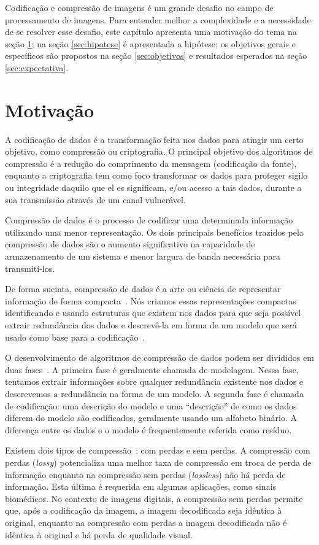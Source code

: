 Codificação e compressão de imagens é um grande desafio no campo de processamento de imagens. Para entender melhor a complexidade e a necessidade de se resolver esse desafio, este capítulo apresenta uma motivação do tema na seção \ref{sec:motivacao}; na seção \ref{sec:hipotese} é apresentada a hipótese; os objetivos gerais e específicos são propostos na seção \ref{sec:objetivos} e  resultados esperados na seção \ref{sec:expectativa}.

\section{Motivação}
\label{sec:motivacao}
A codificação de dados é a transformação feita nos dados para atingir um certo objetivo, como compressão ou criptografia. O principal objetivo dos algoritmos de compressão é a redução do comprimento da mensagem (codificação da fonte), enquanto a criptografia tem como foco transformar os dados para proteger sigilo ou integridade daquilo que el es significam, e/ou acesso a tais dados, durante a sua transmissão através de um canal vulnerável.

Compressão de dados é o processo de codificar uma determinada informação utilizando uma menor representação. Os dois principais benefícios trazidos pela compressão de dados são o aumento significativo na capacidade de armazenamento de um sistema e menor largura de banda necessária para transmití-los.  

De forma sucinta, compressão de dados é a arte ou ciência de representar informação de forma compacta~\cite{sayood2017introduction}. Nós criamos essas representações compactas identificando e usando estruturas que existem nos dados para que seja possível extrair redundância dos dados e descrevê-la em forma de um modelo que será usado como base para a codificação~\cite{sayood2017introduction}. 

O desenvolvimento de algoritmos de compressão de dados podem ser divididos em duas fases~\cite{sayood2017introduction}. A primeira fase é geralmente chamada de modelagem. Nessa fase, tentamos extrair informações sobre qualquer redundância existente nos dados e descrevemos a redundância na forma de um modelo. A segunda fase é chamada de codificação: uma descrição do modelo e uma ``descrição'' de como os dados diferem do modelo são codificados, geralmente usando um alfabeto binário. A diferença entre os dados e o modelo é frequentemente referida como resíduo.

Existem dois tipos de compressão~\cite{sayood2017introduction}: com perdas e sem perdas. A compressão com perdas (\textit{lossy}) potencializa uma melhor taxa de compressão em troca de perda de informação enquanto na compressão sem perdas (\textit{lossless}) não há perda de informação. Esta última é requerida em algumas aplicações, como sinais biomédicos. No contexto de imagens digitais, a compressão sem perdas permite que, após a codificação da imagem, a imagem decodificada seja idêntica à original, enquanto na compressão com perdas a imagem decodificada não é idêntica à original e há perda de qualidade visual.

